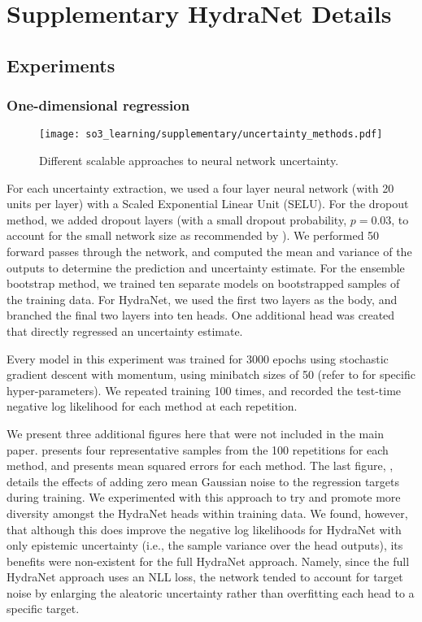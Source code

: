 \chapter{Supplementary HydraNet Details}
\label{chap:appendix_so3_learning}

\section{Experiments}
\subsection{One-dimensional regression}

\begin{figure*}
	\centering
	\texttt{[image: so3\_learning/supplementary/uncertainty\_methods.pdf]}
	\vspace{-.5em}
	\caption{Different scalable approaches to neural network uncertainty. }
	\label{fig:nn-uncertainty}
\end{figure*}

For each uncertainty extraction, we used a four layer neural network (with 20 units per layer) with a Scaled Exponential Linear Unit (SELU). For the dropout method, we added dropout layers (with a small dropout probability, $p=0.03$, to account for the small network size as recommended by \cite{Gal2016-ny}). We performed 50 forward passes through the network, and computed the mean and variance of the outputs to determine the prediction and uncertainty estimate. For the ensemble bootstrap method, we trained ten separate models on bootstrapped samples of the training data. For HydraNet, we used the first two layers as the body, and branched the final two layers into ten heads.  One additional head was created that directly regressed an uncertainty estimate.  


Every model in this experiment was trained for 3000 epochs using stochastic gradient descent with momentum, using minibatch sizes of 50 (refer to  for specific hyper-parameters). We repeated training 100 times, and recorded the test-time negative log likelihood for each method at each repetition.


We present three additional figures here that were not included in the main paper.  presents four representative samples from the 100 repetitions for each method, and  presents mean squared errors for each method. The last figure, , details the effects of adding zero mean Gaussian noise to the regression targets during training. We experimented with this approach to try and promote more diversity amongst the HydraNet heads within training data. We found, however, that although this does improve the negative log likelihoods for HydraNet with only epistemic uncertainty (i.e., the sample variance over the head outputs), its benefits were non-existent for the full HydraNet approach. Namely, since the full HydraNet approach uses an NLL loss, the network tended to account for target noise by enlarging the aleatoric uncertainty rather than overfitting each head to a specific target.

